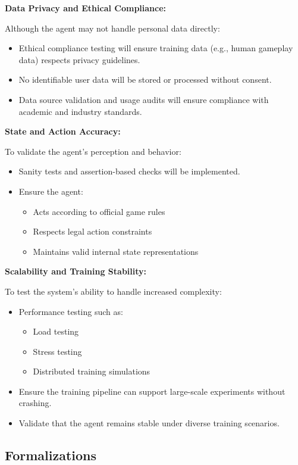 \documentclass{article}
\begin{document}
\noindent\textbf{Data Privacy and Ethical Compliance:}

Although the \RL{} agent may not handle personal data directly:
\begin{itemize}
    \item Ethical compliance testing will ensure training data (e.g., human gameplay data) respects privacy guidelines.
    \item No identifiable user data will be stored or processed without consent.
    \item Data source validation and usage audits will ensure compliance with academic and industry standards.
\end{itemize}

\noindent\textbf{State and Action Accuracy:}

To validate the agent’s perception and behavior:
\begin{itemize}
    \item Sanity tests and assertion-based checks will be implemented.
    \item Ensure the agent:
    \begin{itemize}
        \item Acts according to official game rules
        \item Respects legal action constraints
        \item Maintains valid internal state representations
    \end{itemize}
\end{itemize}

\noindent\textbf{Scalability and Training Stability:}

To test the system’s ability to handle increased complexity:
\begin{itemize}
    \item Performance testing such as:
    \begin{itemize}
        \item Load testing
        \item Stress testing
        \item Distributed training simulations
    \end{itemize}
    \item Ensure the training pipeline can support large-scale experiments without crashing.
    \item Validate that the agent remains stable under diverse training scenarios.
\end{itemize}

\subsection{Formalizations}
\end{document}
